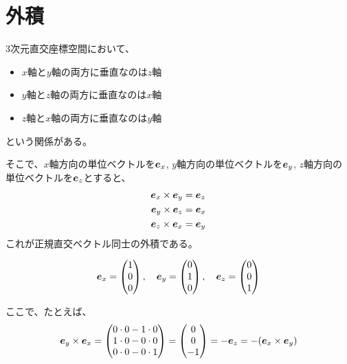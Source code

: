 \documentclass[../../../topic_linear-algebra]{subfiles}
\begin{document}
\sectionline
\section{外積}

3次元直交座標空間において、
\begin{itemize}
  \item $x$軸と$y$軸の両方に垂直なのは$z$軸
  \item $y$軸と$z$軸の両方に垂直なのは$x$軸
  \item $z$軸と$x$軸の両方に垂直なのは$y$軸
\end{itemize}
という関係がある。

\br

そこで、$x$軸方向の単位ベクトルを$\vb*{e}_x$, $y$軸方向の単位ベクトルを$\vb*{e}_y$, $z$軸方向の単位ベクトルを$\vb*{e}_z$とすると、
\begin{align*}
  \vb*{e}_x \times \vb*{e}_y &= \vb*{e}_z \\
  \vb*{e}_y \times \vb*{e}_z &= \vb*{e}_x \\
  \vb*{e}_z \times \vb*{e}_x &= \vb*{e}_y
\end{align*}
これが正規直交ベクトル同士の外積である。

\begin{equation*}
  \vb*{e}_x = \begin{pmatrix}
    1 \\
    0 \\
    0
  \end{pmatrix} , \quad
  \vb*{e}_y = \begin{pmatrix}
    0 \\
    1 \\
    0
  \end{pmatrix} , \quad
  \vb*{e}_z = \begin{pmatrix}
    0 \\
    0 \\
    1
  \end{pmatrix}
\end{equation*}

ここで、たとえば、
\begin{equation*}
  \vb*{e}_y \times \vb*{e}_x = \begin{pmatrix}
    0 \cdot 0 - 1 \cdot 0 \\
    1 \cdot 0 - 0 \cdot 0 \\
    0 \cdot 0 - 0 \cdot 1
  \end{pmatrix} = \begin{pmatrix}
    0 \\
    0 \\
    -1
  \end{pmatrix} = -\vb*{e}_z = - (\vb*{e}_x \times \vb*{e}_y)
\end{equation*}
\end{document}
